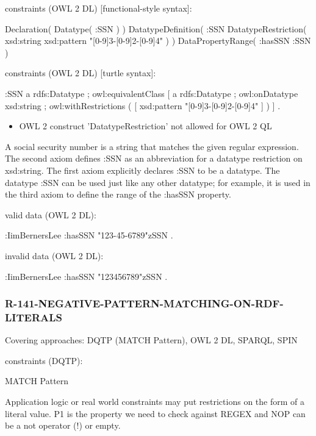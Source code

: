 \documentclass{llncs}
\begin{document}
constraints (OWL 2 DL) [functional-style syntax]:

\begin{ex}
Declaration( Datatype( :SSN ) ) 
DatatypeDefinition( 
    :SSN
    DatatypeRestriction( xsd:string xsd:pattern "[0-9]{3}-[0-9]{2}-[0-9]{4}" ) )     
DataPropertyRange( :hasSSN :SSN ) 
\end{ex}

constraints (OWL 2 DL) [turtle syntax]:

\begin{ex}
:SSN 
    a rdfs:Datatype ;
    owl:equivalentClass [
        a rdfs:Datatype ;
        owl:onDatatype xsd:string ;
        owl:withRestrictions ( 
            [ xsd:pattern "[0-9]{3}-[0-9]{2}-[0-9]{4}" ] ) ] .
\end{ex}

\begin{itemize}
	\item OWL 2 construct 'DatatypeRestriction' not allowed for OWL 2 QL
\end{itemize}

A social security number is a string that matches the given regular expression. 
The second axiom defines :SSN as an abbreviation for a datatype restriction on xsd:string. 
The first axiom explicitly declares :SSN to be a datatype. 
The datatype :SSN can be used just like any other datatype; 
for example, it is used in the third axiom to define the range of the :hasSSN property. 

valid data (OWL 2 DL):

\begin{ex}
:IimBernersLee
    :hasSSN "123-45-6789"^^:SSN .
\end{ex}

invalid data (OWL 2 DL):

\begin{ex}
:IimBernersLee
    :hasSSN "123456789"^^:SSN .
\end{ex}

\subsubsection{R-141-NEGATIVE-PATTERN-MATCHING-ON-RDF-LITERALS}

Covering approaches: DQTP (MATCH Pattern), OWL 2 DL, SPARQL, SPIN

constraints (DQTP):

MATCH Pattern \cite{Kontokostas2014} 

Application logic or real world constraints may put restrictions on the form of a literal value.
P1 is the property we need to check against REGEX and
NOP can be a not operator (!) or empty.
\end{document}
